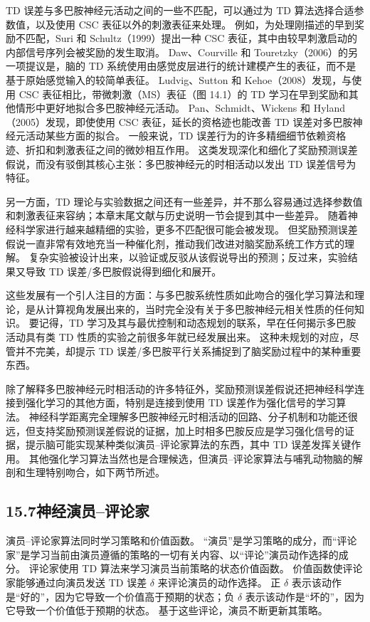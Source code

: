 \documentclass[UTF8, 12pt, fontset=fandol, oneside]{ctexart}
\begin{document}
TD 误差与多巴胺神经元活动之间的一些不匹配，可以通过为 TD 算法选择合适参数值，以及使用 CSC 表征以外的刺激表征来处理。
例如，为处理刚描述的早到奖励不匹配，Suri 和 Schultz（1999）提出一种 CSC 表征，其中由较早刺激启动的内部信号序列会被奖励的发生取消。
Daw、Courville 和 Touretzky（2006）的另一项提议是，脑的 TD 系统使用由感觉皮层进行的统计建模产生的表征，而不是基于原始感觉输入的较简单表征。
Ludvig、Sutton 和 Kehoe（2008）发现，与使用 CSC 表征相比，带微刺激（MS）表征（图 14.1）的 TD 学习在早到奖励和其他情形中更好地拟合多巴胺神经元活动。
Pan、Schmidt、Wickens 和 Hyland（2005）发现，即使使用 CSC 表征，延长的资格迹也能改善 TD 误差对多巴胺神经元活动某些方面的拟合。
一般来说，TD 误差行为的许多精细细节依赖资格迹、折扣和刺激表征之间的微妙相互作用。
这类发现深化和细化了奖励预测误差假说，而没有驳倒其核心主张：多巴胺神经元的时相活动以发出 TD 误差信号为特征。

另一方面，TD 理论与实验数据之间还有一些差异，并不那么容易通过选择参数值和刺激表征来容纳；本章末尾文献与历史说明一节会提到其中一些差异。
随着神经科学家进行越来越精细的实验，更多不匹配很可能会被发现。
但奖励预测误差假说一直非常有效地充当一种催化剂，推动我们改进对脑奖励系统工作方式的理解。
复杂实验被设计出来，以验证或反驳从该假说导出的预测；反过来，实验结果又导致 TD 误差/多巴胺假说得到细化和展开。

这些发展有一个引人注目的方面：与多巴胺系统性质如此吻合的强化学习算法和理论，是从计算视角发展出来的，当时完全没有关于多巴胺神经元相关性质的任何知识。
要记得，TD 学习及其与最优控制和动态规划的联系，早在任何揭示多巴胺活动具有类 TD 性质的实验之前很多年就已经发展出来。
这种未规划的对应，尽管并不完美，却提示 TD 误差/多巴胺平行关系捕捉到了脑奖励过程中的某种重要东西。

除了解释多巴胺神经元时相活动的许多特征外，奖励预测误差假说还把神经科学连接到强化学习的其他方面，特别是连接到使用 TD 误差作为强化信号的学习算法。
神经科学距离完全理解多巴胺神经元时相活动的回路、分子机制和功能还很远，但支持奖励预测误差假说的证据，加上时相多巴胺反应是学习强化信号的证据，提示脑可能实现某种类似演员--评论家算法的东西，其中 TD 误差发挥关键作用。
其他强化学习算法当然也是合理候选，但演员--评论家算法与哺乳动物脑的解剖和生理特别吻合，如下两节所述。

\subsection*{15.7\quad 神经演员--评论家}

演员--评论家算法同时学习策略和价值函数。
“演员”是学习策略的成分，而“评论家”是学习当前由演员遵循的策略的一切有关内容、以“评论”演员动作选择的成分。
评论家使用 TD 算法来学习演员当前策略的状态价值函数。
价值函数使评论家能够通过向演员发送 TD 误差 $\delta$ 来评论演员的动作选择。
正 $\delta$ 表示该动作是“好的”，因为它导致一个价值高于预期的状态；负 $\delta$ 表示该动作是“坏的”，因为它导致一个价值低于预期的状态。
基于这些评论，演员不断更新其策略。
\end{document}
